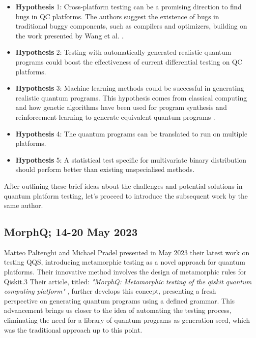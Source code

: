 \begin{itemize}
\vspace{-10pt}
\begin{itemize}
    \item[] \textbf{Hypothesis} 1: Cross-platform testing can be a promising direction to find bugs in QC platforms. The authors suggest the existence of bugs in traditional buggy components, such as compilers and optimizers, building on the work presented by Wang et al. \cite{wang2021qdiff}.
    \item[] \textbf{Hypothesis} 2: Testing with automatically generated realistic quantum programs could boost the effectiveness of current differential testing on QC platforms.
    \item[] \textbf{Hypothesis} 3: Machine learning methods could be successful in generating realistic quantum programs. This hypothesis comes from classical computing and how genetic algorithms have been used for program synthesis \cite{koza1994genetic} and reinforcement learning to generate equivalent quantum programs \cite{moro2021quantum}.
    \item[] \textbf{Hypothesis} 4: The quantum programs can be translated to run on multiple platforms.
    \item[] \textbf{Hypothesis} 5: A statistical test specific for multivariate binary distribution should perform better than existing unspecialised methods.
\end{itemize}

After outlining these brief ideas about the challenges and potential solutions in quantum platform testing, let's proceed to introduce the subsequent work by the same author.

\subsection{MorphQ; 14-20 May 2023}
\label{Ch3.1.2:MorphQ}
Matteo Paltenghi and Michael Pradel presented in May 2023 their latest work on testing QQS, introducing metamorphic testing as a novel approach for quantum platforms. Their innovative method involves the design of metamorphic rules for Qiskit.3 Their article, titled: \textit{"MorphQ: Metamorphic testing of the qiskit quantum computing platform"} \cite{paltenghi2023morphq}, further develops this concept, presenting a fresh perspective on generating quantum programs using a defined grammar. This advancement brings us closer to the idea of automating the testing process, eliminating the need for a library of quantum programs as generation seed, which was the traditional approach up to this point.\newline


\end{itemize}
